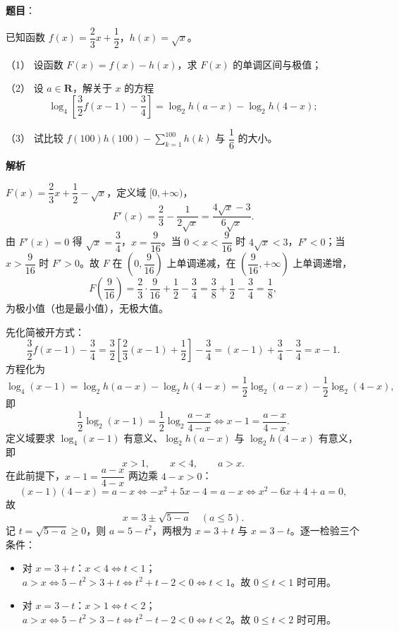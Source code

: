 \begin{answer}

\textbf{题目}：

已知函数 $f(x)=\dfrac23x+\dfrac12$，$h(x)=\sqrt x$。

（1） 设函数 $F(x)=f(x)-h(x)$，求 $F(x)$ 的单调区间与极值；

（2） 设 $a\in\mathbf R$，解关于 $x$ 的方程
\nopagebreak[4]
\[\log_4\left[\frac32f(x-1)-\frac34\right]=\log_2h(a-x)-\log_2h(4-x);\]

（3） 试比较 $f(100)h(100)-\displaystyle\sum_{k=1}^{100}h(k)$ 与 $\dfrac16$ 的大小。

\textbf{解析}

$F(x)=\dfrac23x+\dfrac12-\sqrt x$，定义域 $[0,+\infty)$，
\nopagebreak[4]
\[F'(x)=\frac23-\frac{1}{2\sqrt x}=\frac{4\sqrt x-3}{6\sqrt x}.\]
由 $F'(x)=0$ 得 $\sqrt x=\dfrac34$，$x=\dfrac9{16}$。当 $0<x<\dfrac9{16}$ 时 $4\sqrt x<3$，$F'<0$；当 $x>\dfrac9{16}$ 时 $F'>0$。故 $F$ 在 $\left(0,\dfrac9{16}\right)$ 上单调递减，在 $\left(\dfrac9{16},+\infty\right)$ 上单调递增，
\nopagebreak[4]
\[F\left(\frac9{16}\right)=\frac23\cdot\frac9{16}+\frac12-\frac34=\frac38+\frac12-\frac34=\frac18,\]
为极小值（也是最小值），无极大值。

先化简被开方式：
\nopagebreak[4]
\[\frac32f(x-1)-\frac34=\frac32\left[\frac23(x-1)+\frac12\right]-\frac34=(x-1)+\frac34-\frac34=x-1.\]
方程化为
\nopagebreak[4]
\[\log_4(x-1)=\log_2h(a-x)-\log_2h(4-x)=\frac12\log_2(a-x)-\frac12\log_2(4-x),\]
即
\nopagebreak[4]
\[\frac12\log_2(x-1)=\frac12\log_2\frac{a-x}{4-x}\iff x-1=\frac{a-x}{4-x}.\]
定义域要求 $\log_4(x-1)$ 有意义、$\log_2h(a-x)$ 与 $\log_2h(4-x)$ 有意义，即
\nopagebreak[4]
\[x>1,\qquad x<4,\qquad a>x.\]
在此前提下，$x-1=\dfrac{a-x}{4-x}$ 两边乘 $4-x>0$：
\nopagebreak[4]
\[(x-1)(4-x)=a-x\iff -x^2+5x-4=a-x\iff x^2-6x+4+a=0,\]
故
\nopagebreak[4]
\[x=3\pm\sqrt{5-a}\quad(a\leqslant5).\]
记 $t=\sqrt{5-a}\geqslant0$，则 $a=5-t^2$，两根为 $x=3+t$ 与 $x=3-t$。逐一检验三个条件：

\begin{itemize}
\item 对 $x=3+t$：$x<4\iff t<1$；$a>x\iff 5-t^2>3+t\iff t^2+t-2<0\iff t<1$。故 $0\leqslant t<1$ 时可用。
\item 对 $x=3-t$：$x>1\iff t<2$；$a>x\iff 5-t^2>3-t\iff t^2-t-2<0\iff t<2$。故 $0\leqslant t<2$ 时可用。
\end{itemize}


\end{answer}

